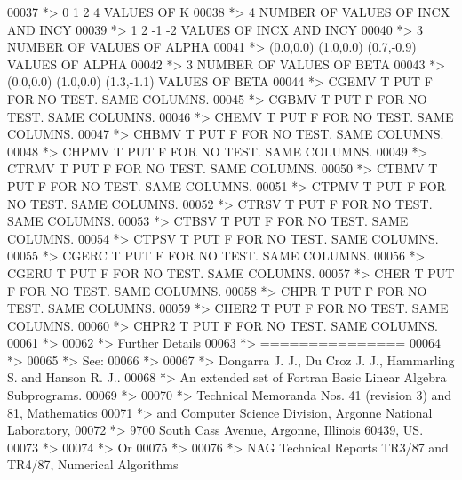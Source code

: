 \begin{DoxyCode}
00037 \textcolor{comment}{*> 0 1 2 4           VALUES OF K}
00038 \textcolor{comment}{*> 4                 NUMBER OF VALUES OF INCX AND INCY}
00039 \textcolor{comment}{*> 1 2 -1 -2         VALUES OF INCX AND INCY}
00040 \textcolor{comment}{*> 3                 NUMBER OF VALUES OF ALPHA}
00041 \textcolor{comment}{*> (0.0,0.0) (1.0,0.0) (0.7,-0.9)       VALUES OF ALPHA}
00042 \textcolor{comment}{*> 3                 NUMBER OF VALUES OF BETA}
00043 \textcolor{comment}{*> (0.0,0.0) (1.0,0.0) (1.3,-1.1)       VALUES OF BETA}
00044 \textcolor{comment}{*> CGEMV  T PUT F FOR NO TEST. SAME COLUMNS.}
00045 \textcolor{comment}{*> CGBMV  T PUT F FOR NO TEST. SAME COLUMNS.}
00046 \textcolor{comment}{*> CHEMV  T PUT F FOR NO TEST. SAME COLUMNS.}
00047 \textcolor{comment}{*> CHBMV  T PUT F FOR NO TEST. SAME COLUMNS.}
00048 \textcolor{comment}{*> CHPMV  T PUT F FOR NO TEST. SAME COLUMNS.}
00049 \textcolor{comment}{*> CTRMV  T PUT F FOR NO TEST. SAME COLUMNS.}
00050 \textcolor{comment}{*> CTBMV  T PUT F FOR NO TEST. SAME COLUMNS.}
00051 \textcolor{comment}{*> CTPMV  T PUT F FOR NO TEST. SAME COLUMNS.}
00052 \textcolor{comment}{*> CTRSV  T PUT F FOR NO TEST. SAME COLUMNS.}
00053 \textcolor{comment}{*> CTBSV  T PUT F FOR NO TEST. SAME COLUMNS.}
00054 \textcolor{comment}{*> CTPSV  T PUT F FOR NO TEST. SAME COLUMNS.}
00055 \textcolor{comment}{*> CGERC  T PUT F FOR NO TEST. SAME COLUMNS.}
00056 \textcolor{comment}{*> CGERU  T PUT F FOR NO TEST. SAME COLUMNS.}
00057 \textcolor{comment}{*> CHER   T PUT F FOR NO TEST. SAME COLUMNS.}
00058 \textcolor{comment}{*> CHPR   T PUT F FOR NO TEST. SAME COLUMNS.}
00059 \textcolor{comment}{*> CHER2  T PUT F FOR NO TEST. SAME COLUMNS.}
00060 \textcolor{comment}{*> CHPR2  T PUT F FOR NO TEST. SAME COLUMNS.}
00061 \textcolor{comment}{*>}
00062 \textcolor{comment}{*> Further Details}
00063 \textcolor{comment}{*> ===============}
00064 \textcolor{comment}{*>}
00065 \textcolor{comment}{*>    See:}
00066 \textcolor{comment}{*>}
00067 \textcolor{comment}{*>       Dongarra J. J., Du Croz J. J., Hammarling S.  and Hanson R. J..}
00068 \textcolor{comment}{*>       An  extended  set of Fortran  Basic Linear Algebra Subprograms.}
00069 \textcolor{comment}{*>}
00070 \textcolor{comment}{*>       Technical  Memoranda  Nos. 41 (revision 3) and 81,  Mathematics}
00071 \textcolor{comment}{*>       and  Computer Science  Division,  Argonne  National Laboratory,}
00072 \textcolor{comment}{*>       9700 South Cass Avenue, Argonne, Illinois 60439, US.}
00073 \textcolor{comment}{*>}
00074 \textcolor{comment}{*>       Or}
00075 \textcolor{comment}{*>}
00076 \textcolor{comment}{*>       NAG  Technical Reports TR3/87 and TR4/87,  Numerical Algorithms}

\end{DoxyCode}
